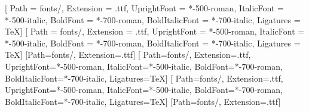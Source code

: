 
\usepackage[a4paper,top=22mm,bottom=24mm,inner=24mm,outer=22mm,
            headheight=14pt,headsep=8mm,footskip=11mm]{geometry}

\usepackage{amsmath}
\usepackage{amssymb}
\usepackage{mathtools}

\usepackage{fontspec}
\usepackage{unicode-math}
\usepackage{polyglossia}
\setdefaultlanguage{russian}

\setmainfont{cmu-serif}[
  Path           = fonts/,
  Extension      = .ttf,
  UprightFont    = *-500-roman,
  ItalicFont     = *-500-italic,
  BoldFont       = *-700-roman,
  BoldItalicFont = *-700-italic,
  Ligatures      = TeX]
\setsansfont{cmu-sans-serif}[
  Path           = fonts/,
  Extension      = .ttf,
  UprightFont    = *-500-roman,
  ItalicFont     = *-500-italic,
  BoldFont       = *-700-roman,
  BoldItalicFont = *-700-italic,
  Ligatures      = TeX]
\setmonofont{cmu-typewriter-text-500-roman}[Path=fonts/, Extension=.ttf]
\newfontfamily{}[
  Path=fonts/, Extension=.ttf, UprightFont=*-500-roman, ItalicFont=*-500-italic,
  BoldFont=*-700-roman, BoldItalicFont=*-700-italic, Ligatures=TeX]
\newfontfamily{}[
  Path=fonts/, Extension=.ttf, UprightFont=*-500-roman, ItalicFont=*-500-italic,
  BoldFont=*-700-roman, BoldItalicFont=*-700-italic, Ligatures=TeX]
\newfontfamily{}[Path=fonts/, Extension=.ttf]


\usepackage{icomma}           %
\linespread{1.06}
\setlength{\parindent}{1.25em}
\setlength{\parskip}{0.25em plus 0.15em}
\setlength{\emergencystretch}{2.5em}

\usepackage{xcolor}

